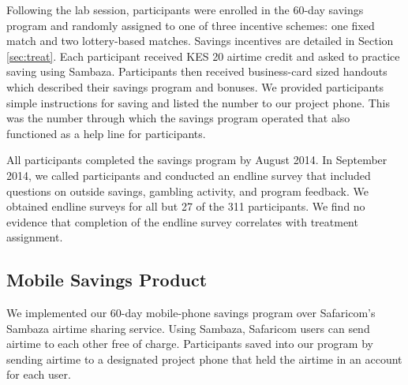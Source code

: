 \documentclass[11pt]{article}
\begin{document}
		Following the lab session, participants were enrolled in the 60-day savings program and randomly assigned to one of three incentive schemes: one fixed match and two lottery-based matches. Savings incentives are detailed in Section \ref{sec:treat}. Each participant received KES 20 airtime credit and asked to practice saving using Sambaza. Participants then received business-card sized handouts which described their savings program and bonuses. We provided participants simple instructions for saving and listed the number to our project phone. This was the number through which the savings program operated that also functioned as a help line for participants.

		All participants completed the savings program by August 2014. In September 2014, we called participants and conducted an endline survey that included questions on outside savings, gambling activity, and program feedback. We obtained endline surveys for all but 27 of the 311 participants. We find no evidence that completion of the endline survey correlates with treatment assignment.

		\clearpage

	\subsection{Mobile Savings Product}

		We implemented our 60-day mobile-phone savings program over Safaricom's Sambaza airtime sharing service. Using Sambaza, Safaricom users can send airtime to each other free of charge. Participants saved into our program by sending airtime to a designated project phone that held the airtime in an account for each user.



\end{document}
